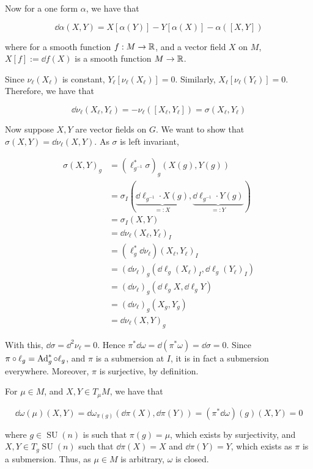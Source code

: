 \documentclass{article}
\DeclareMathOperator{\SU}{SU}
\begin{document}
Now for a one form \(\alpha\), we have that

\[\dd\alpha(X, Y) = X[\alpha(Y)] - Y[\alpha(X)] - \alpha([X, Y])\]

where for a smooth function \(f : M \to \mathbb{R}\), and a vector field \(X\) on \(M\), \(X[f] := \dd f(X)\) is a smooth function \(M \to \mathbb{R}\).

Since \(\nu_\ell(X_\ell)\) is constant, \(Y_\ell[\nu_\ell(X_\ell)] = 0\). Similarly, \(X_\ell[\nu_\ell(Y_\ell)] = 0\). Therefore, we have that

\[\dd \nu_\ell(X_\ell, Y_\ell) = -\nu_\ell([X_\ell, Y_\ell]) = \sigma(X_\ell, Y_\ell)\]

Now suppose \(X, Y\) are vector fields on \(G\). We want to show that \(\sigma(X, Y) = \dd\nu_\ell(X, Y)\). As \(\sigma\) is left invariant,

\begin{align*}
    \sigma(X, Y)_g &= (\ell_{g^{-1}}^* \sigma)_g(X(g), Y(g)) \\
    &= \sigma_I(\underbrace{\dd \ell_{g^{-1}} \cdot X(g)}_{=:X}, \underbrace{\dd \ell_{g^{-1}} \cdot Y(g)}_{=:Y}) \\
    &= \sigma_I(X, Y) \\
    &= \dd\nu_\ell(X_\ell, Y_\ell)_I \\
    &= (\ell_g^*\dd\nu_\ell)(X_\ell, Y_\ell)_I \\
    &= (\dd\nu_\ell)_g(\dd\ell_g(X_\ell)_I, \dd\ell_g(Y_\ell)_I) \\
    &= (\dd\nu_\ell)_g(\dd \ell_g X, \dd\ell_g Y) \\
    &= (\dd\nu_\ell)_g(X_g, Y_g) \\
    &= \dd\nu_\ell(X, Y)_g
\end{align*}

With this, \(\dd\sigma = \dd^2\nu_\ell = 0\). Hence \(\pi^*\dd\omega = \dd(\pi^*\omega) = \dd\sigma = 0\). Since \(\pi \circ \ell_g = \operatorname{Ad}_g^* \circ \ell_g\), and \(\pi\) is a submersion at \(I\), it is in fact a submersion everywhere. Moreover, \(\pi\) is surjective, by definition.

For \(\mu \in  M\), and \(X, Y \in T_\mu  M\), we have that

\[\dd\omega(\mu)(X, Y) = \dd\omega_{\pi(g)}(\dd\pi(X), \dd\pi(Y)) = (\pi^*\dd\omega)(g)(X, Y) = 0\]

where \(g \in \SU(n)\) is such that \(\pi(g) = \mu\), which exists by surjectivity, and \(X, Y \in T_g\SU(n)\) such that \(\dd\pi(X) = X\) and \(\dd\pi(Y) = Y\), which exists as \(\pi\) is a submersion. Thus, as \(\mu \in  M\) is arbitrary, \(\omega\) is closed.
\end{document}
